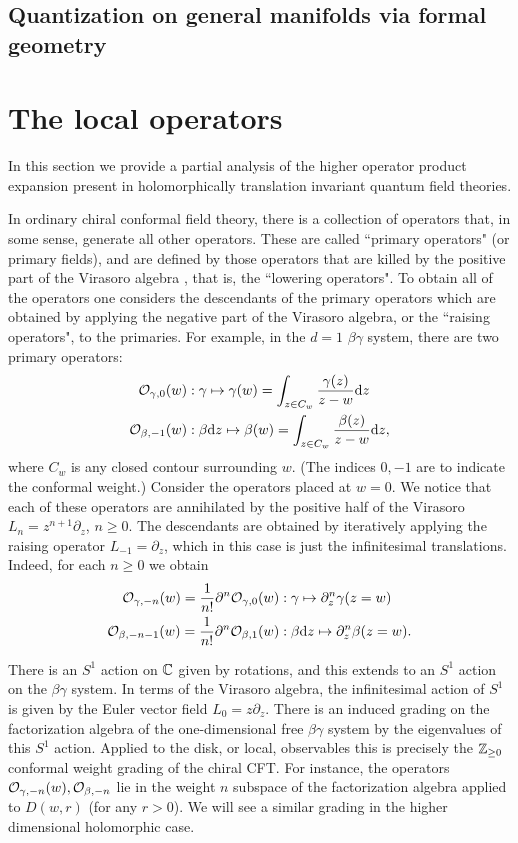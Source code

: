 \documentclass[10pt]{amsart}
\begin{document}
\subsection{Quantization on general manifolds via formal geometry}


\section{The local operators}
In this section we provide a partial analysis of the higher operator product expansion present in holomorphically translation invariant quantum field theories. 

In ordinary chiral conformal field theory, there is a collection of operators that, in some sense, generate all other operators. 
These are called ``primary operators" (or primary fields), and are defined by those operators that are killed by the positive part of the Virasoro algebra \cite{polchinski}, that is, the ``lowering operators". 
To obtain all of the operators one considers the descendants of the primary operators which are obtained by applying the negative part of the Virasoro algebra, or the ``raising operators", to the primaries. 
For example, in the $d=1$ $\beta\gamma$ system, there are two primary operators:
\begin{align*}
\mathcal O_{\gamma,0} (w) & : \gamma \mapsto \gamma(w) = \int_{z \in C_w} \frac{\gamma(z)}{z-w} {\rm d} z  \\
\mathcal O_{\beta,-1} (w) & : \beta {\rm d} z \mapsto \beta(w) = \int_{z \in C_w} \frac{\beta(z)}{z-w} {\rm d} z ,
\end{align*}
where $C_w$ is any closed contour surrounding $w$. 
(The indices $0,-1$ are to indicate the conformal weight.)
Consider the operators placed at $w=0$.
We notice that each of these operators are annihilated by the positive half of the Virasoro $L_n = z^{n+1} \partial_z$, $n \geq 0$.
The descendants are obtained by iteratively applying the raising operator $L_{-1} = \partial_z$, which in this case is just the infinitesimal translations. 
Indeed, for each $n \geq 0$ we obtain
\begin{align*}
\mathcal O_{\gamma,-n}(w) = \frac{1}{n!} \partial^n \mathcal O_{\gamma,0}(w) & : \gamma \mapsto \partial_z^n \gamma(z = w) \\
\mathcal O_{\beta,-n-1}(w) = \frac{1}{n!} \partial^n \mathcal O_{\beta,1}(w) & : \beta {\rm d} z \mapsto \partial_z^n \beta(z=w) .
\end{align*}

There is an $S^1$ action on $\mathbb C$ given by rotations, and this extends to an $S^1$ action on the $\beta\gamma$ system.
In terms of the Virasoro algebra, the infinitesimal action of $S^1$ is given by the Euler vector field $L_0 = z \partial_z$. 
There is an induced grading on the factorization algebra of the one-dimensional free $\beta\gamma$ system by the eigenvalues of this $S^1$ action.
Applied to the disk, or local, observables this is precisely the $\mathbb Z_{\geq 0}$ conformal weight grading of the chiral CFT.
For instance, the operators $\mathcal O_{\gamma,-n}(w), \mathcal O_{\beta, -n}$ lie in the weight $n$ subspace of the factorization algebra applied to $D(w,r)$ (for any $r >0$). 
We will see a similar grading in the higher dimensional holomorphic case.
\end{document}
